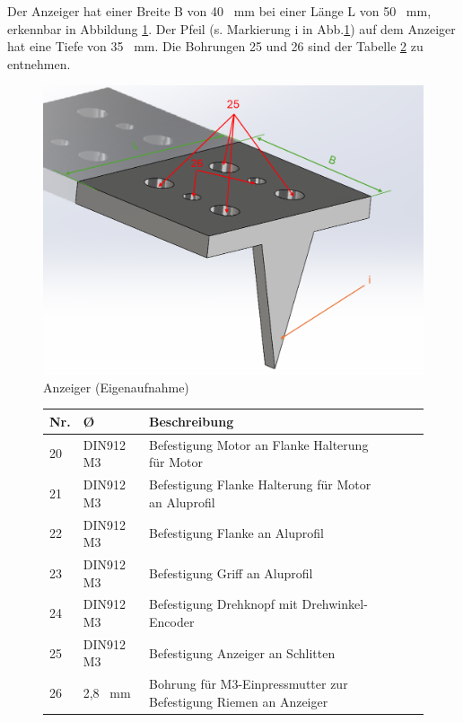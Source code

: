 Der Anzeiger hat einer Breite B von 40 \ mm bei einer Länge L von 50 \ mm, erkennbar in Abbildung \ref{AnzeigerK}. Der Pfeil (s. Markierung i in Abb.\ref{AnzeigerK}) auf dem Anzeiger hat eine Tiefe von 35 \ mm. Die Bohrungen 25 und 26 sind der Tabelle \ref{BohrungenAK} zu entnehmen.

\begin{figure}[H]
	\begin{center}
		\includegraphics[width=\textwidth]{Images/Konstruktion/AnzeigerK.png}
		\caption{Anzeiger (Eigenaufnahme)} \label{AnzeigerK}
	\end{center}
\end{figure}  
 
 \begin{figure}[H]
 	\begin{center}
 		\fontsize{8}{10}\selectfont
 		\begin{tabularx}{\textwidth}{|p{0.4cm}|p{1.2cm}|X|X|X|X|} 
 			\hline 
 			\textbf{Nr.} & \textbf{\O} & \textbf{Beschreibung} \\ \hline
 			20 & DIN912 M3 & Befestigung Motor an Flanke Halterung für Motor \\ \hline
 			21 & DIN912 M3 & Befestigung Flanke Halterung für Motor an Aluprofil \\ \hline
 			22 & DIN912 M3 & Befestigung Flanke an Aluprofil  \\ \hline
 			23 & DIN912 M3 & Befestigung Griff an Aluprofil \\ \hline
 			24 & DIN912 M3 & Befestigung Drehknopf mit Drehwinkel-Encoder \\ \hline
 			25 & DIN912 M3 & Befestigung Anzeiger an Schlitten \\ \hline
 			26 & 2,8 \ mm & Bohrung für M3-Einpressmutter zur Befestigung Riemen an Anzeiger \\ \hline
 		\end{tabularx}
 			\label{BohrungenAK}
 	\end{center}
 \end{figure}


